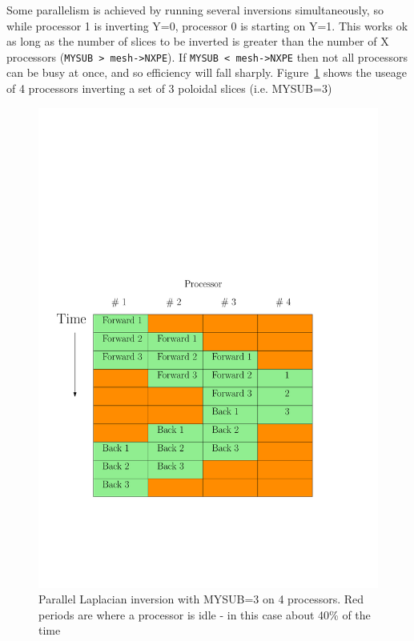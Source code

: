 \documentclass[12pt]{article}
\begin{document}
Some parallelism is achieved by running several inversions simultaneously,
so while processor 1 is inverting Y=0, processor 0 is starting on Y=1.
This works ok as long as the number of slices to be inverted is greater than
the number of X processors (\lstinline!MYSUB > mesh->NXPE!). If
\lstinline!MYSUB < mesh->NXPE! then
not all processors can be busy at once, and so efficiency will fall sharply.
Figure~\ref{fig:par_laplace} shows the useage of 4 processors inverting a set
of 3 poloidal slices
(i.e. MYSUB=3)
\begin{figure}[htbp!]
\centering
\includegraphics[width=0.5\paperwidth, keepaspectratio]{figs/par_laplace.pdf}
\caption{Parallel Laplacian inversion with MYSUB=3 on 4 processors. Red periods are where a processor is idle - in this case about 40\% of the time}
\label{fig:par_laplace}
\end{figure}
\end{document}

